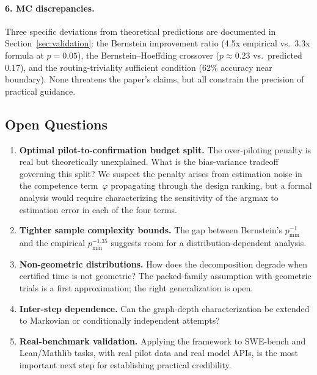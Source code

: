 \documentclass[twoside,11pt]{article}
\newcommand{\pmin}{p_{\min}}
\begin{document}
\paragraph{6. MC discrepancies.}
Three specific deviations from theoretical predictions are documented in Section~\ref{sec:validation}: the Bernstein improvement ratio (4.5x empirical vs.\ 3.3x formula at $p = 0.05$), the Bernstein--Hoeffding crossover ($p \approx 0.23$ vs.\ predicted $0.17$), and the routing-triviality sufficient condition (62\% accuracy near boundary).
None threatens the paper's claims, but all constrain the precision of practical guidance.

\subsection{Open Questions}

\begin{enumerate}
\item \textbf{Optimal pilot-to-confirmation budget split.}
The over-piloting penalty is real but theoretically unexplained.
What is the bias-variance tradeoff governing this split?
We suspect the penalty arises from estimation noise in the competence term~$\varphi$ propagating through the design ranking, but a formal analysis would require characterizing the sensitivity of the argmax to estimation error in each of the four terms.

\item \textbf{Tighter sample complexity bounds.}
The gap between Bernstein's $\pmin^{-1}$ and the empirical $\pmin^{-1.35}$ suggests room for a distribution-dependent analysis.

\item \textbf{Non-geometric distributions.}
How does the decomposition degrade when certified time is not geometric?
The packed-family assumption with geometric trials is a first approximation; the right generalization is open.

\item \textbf{Inter-step dependence.}
Can the graph-depth characterization be extended to Markovian or conditionally independent attempts?

\item \textbf{Real-benchmark validation.}
Applying the framework to SWE-bench and Lean/Mathlib tasks, with real pilot data and real model APIs, is the most important next step for establishing practical credibility.
\end{enumerate}
\end{document}
